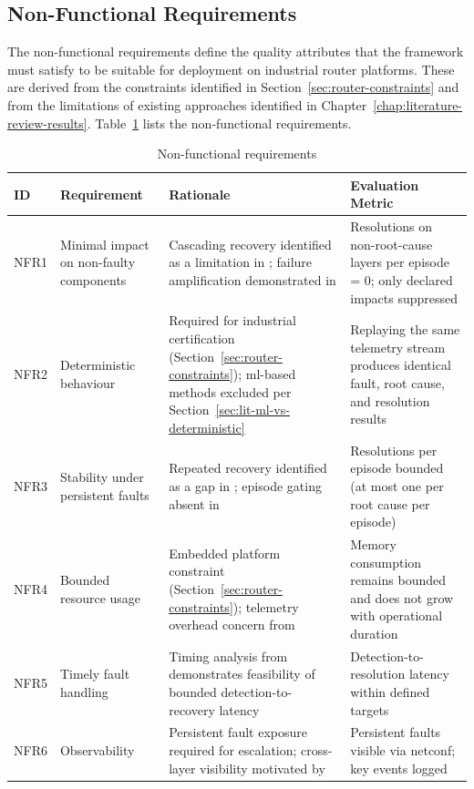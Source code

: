 \subsection{Non-Functional Requirements}\label{sec:non-functional-requirements}

The non-functional requirements define the quality attributes that the framework must satisfy to be suitable for deployment on industrial router platforms. These are derived from the constraints identified in Section~\ref{sec:router-constraints} and from the limitations of existing approaches identified in Chapter~\ref{chap:literature-review-results}. Table~\ref{tab:non-functional-requirements} lists the non-functional requirements.

\begin{table}[htbp]
\centering
\caption{Non-functional requirements}
\label{tab:non-functional-requirements}
\begin{tabular}{p{1.2cm} p{3.7cm} p{5.0cm} p{4.8cm}}
\toprule
ID & Requirement & Rationale & Evaluation Metric \\
\midrule
NFR1 & Minimal impact on non-faulty components & Cascading recovery identified as a limitation in \cite{ref17,ref20}; failure amplification demonstrated in \cite{ref16} & Resolutions on non-root-cause layers per episode = 0; only declared impacts suppressed \\
NFR2 & Deterministic behaviour & Required for industrial certification (Section~\ref{sec:router-constraints}); \gls{ml}-based methods excluded per Section~\ref{sec:lit-ml-vs-deterministic} & Replaying the same telemetry stream produces identical fault, root cause, and resolution results \\
NFR3 & Stability under persistent faults & Repeated recovery identified as a gap in \cite{ref20}; episode gating absent in \cite{ref17,ref19} & Resolutions per episode bounded (at most one per root cause per episode) \\
NFR4 & Bounded resource usage & Embedded platform constraint (Section~\ref{sec:router-constraints}); telemetry overhead concern from \cite{ref14,ref17} & Memory consumption remains bounded and does not grow with operational duration \\
NFR5 & Timely fault handling & Timing analysis from \cite{ref23,ref25} demonstrates feasibility of bounded detection-to-recovery latency & Detection-to-resolution latency within defined targets \\
NFR6 & Observability & Persistent fault exposure required for escalation; cross-layer visibility motivated by \cite{ref13,ref15} & Persistent faults visible via \gls{netconf}; key events logged \\

\end{tabular}
\end{table}
